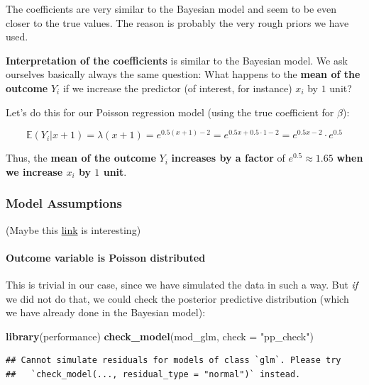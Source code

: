 \documentclass[
]{article}
\newenvironment{Shaded}{\begin{snugshade}}{\end{snugshade}}
\newcommand{\AttributeTok}[1]{\textcolor[rgb]{0.13,0.29,0.53}{#1}}
\newcommand{\FunctionTok}[1]{\textcolor[rgb]{0.13,0.29,0.53}{\textbf{#1}}}
\newcommand{\NormalTok}[1]{#1}
\newcommand{\StringTok}[1]{\textcolor[rgb]{0.31,0.60,0.02}{#1}}
\begin{document}
The coefficients are very similar to the Bayesian model and seem to be
even closer to the true values. The reason is probably the very rough
priors we have used.

\textbf{Interpretation of the coefficients} is similar to the Bayesian
model. We ask ourselves basically always the same question: What happens
to the \textbf{mean of the outcome} \(Y_i\) if we increase the predictor
(of interest, for instance) \(x_i\) by \(1\) unit?

Let's do this for our Poisson regression model (using the true
coefficient for \(\beta\)):

\[\mathbb{E}(Y_i | x+1) = \lambda(x+1) = e^{0.5(x+1)-2} = e^{0.5x + 0.5 \cdot 1 - 2} = e^{0.5x-2} \cdot e^{0.5}\]

Thus, the \textbf{mean of the outcome} \(Y_i\) \textbf{increases by a
factor} of \(e^{0.5} \approx 1.65\) \textbf{when we increase \(x_i\) by
\(1\) unit}.

\subsubsection{Model Assumptions}\label{model-assumptions}

(Maybe this
\href{https://cambiotraining.github.io/stats-glm/materials/checking-assumptions.html}{link}
is interesting)

\paragraph{Outcome variable is Poisson
distributed}\label{outcome-variable-is-poisson-distributed}

This is trivial in our case, since we have simulated the data in such a
way. But \emph{if} we did not do that, we could check the posterior
predictive distribution (which we have already done in the Bayesian
model):

\begin{Shaded}
\begin{Highlighting}[]
\FunctionTok{library}\NormalTok{(performance)}
\FunctionTok{check\_model}\NormalTok{(mod\_glm, }\AttributeTok{check =} \StringTok{"pp\_check"}\NormalTok{)}
\end{Highlighting}
\end{Shaded}

\begin{verbatim}
## Cannot simulate residuals for models of class `glm`. Please try
##   `check_model(..., residual_type = "normal")` instead.
\end{verbatim}
\end{document}
